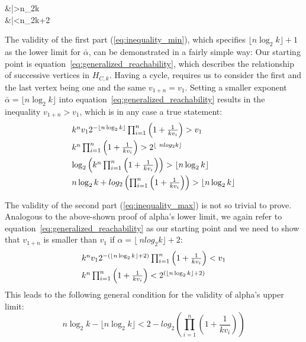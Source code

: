 \begin{samepage}
	\begin{flalign}
		\label{eq:inequality_min}
		&\bar\alpha>\lfloor n\log_2k\rfloor\\	
		\label{eq:inequality_max}
		&\bar\alpha<\lfloor n\log_2k\rfloor+2
	\end{flalign}
\end{samepage}

The validity of the first part (\ref{eq:inequality_min}), which specifies $\lfloor n\log_2k\rfloor+1$ as the lower limit for $\bar\alpha$, can be demonstrated in a fairly simple way: Our starting point is equation~\ref{eq:generalized_reachability}, which describes the relationship of successive vertices in $H_{C,k}$. Having a cycle, requires us to consider the first and the last vertex being one and the same $v_{1+n}=v_1$. Setting a smaller exponent $\bar\alpha=\lfloor n\log_2k\rfloor$ into equation~\ref{eq:generalized_reachability} results in the inequality $v_{1+n}>v_1$, which is in any case a true statement:
\begin{equation*}
	\begin{array}{l}
		k^nv_12^{-\lfloor n\log_2k\rfloor}\prod_{i=1}^{n}\left(1+\frac{1}{kv_{i}}\right)>v_1
		\\[\medskipamount]
		k^n\prod_{i=1}^{n}\left(1+\frac{1}{kv_{i}}\right)>2^{\lfloor\ nlog_2k\rfloor}
		\\[\medskipamount]
		\log_2\left(k^n\prod_{i=1}^{n}\left(1+\frac{1}{kv_{i}}\right)\right)>\lfloor n\log_2k\rfloor
		\\[\medskipamount]
		n\log_2k+log_2\left(\prod_{i=1}^{n}\left(1+\frac{1}{kv_{i}}\right)\right)>\lfloor n\log_2k\rfloor
	\end{array}	
\end{equation*}

The validity of the second part (\ref{eq:inequality_max}) is not so trivial to prove. Analogous to the above-shown proof of alpha's lower limit, we again refer to equation~\ref{eq:generalized_reachability} as our starting point and we need to show that $v_{1+n}$ is smaller than $v_1$ if $\alpha=\lfloor\ nlog_2k\rfloor+2$:
\begin{equation*}
	\begin{array}{l}
		k^nv_12^{-\left(\lfloor n\log_2k\rfloor+2\right)}\prod_{i=1}^{n}\left(1+\frac{1}{kv_{i}}\right)<v_1
		\\[\medskipamount]
		k^n\prod_{i=1}^{n}\left(1+\frac{1}{kv_{i}}\right)<2^{\left(\lfloor n\log_2k\rfloor+2\right)}
	\end{array}	
\end{equation*}
This leads to the following general condition for the validity of alpha's upper limit:
\begin{equation}
\label{eq:condition_max}
	n\log_2k-\lfloor n\log_2k\rfloor<2-log_2\left(\prod_{i=1}^{n}\left(1+\frac{1}{kv_{i}}\right)\right)
\end{equation}

